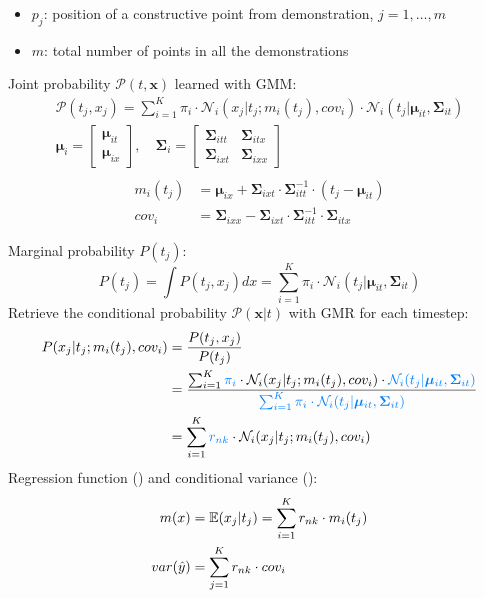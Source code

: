 \documentclass{article}
\begin{document}
\begin{itemize}
  \item $p_{j}$: position of a constructive point from demonstration, $j=1, \dots, m$
  \item $m$: total number of points in all the demonstrations
\end{itemize}
Joint probability $\mathcal{P}(t, \bm{x})$ learned with GMM:
\begin{gather}
  \mathcal{P}(t_{j}, x_{j}) = \sum^{K}_{i=1} \pi_{i} \cdot \mathcal{N}_{i}(x_{j}|t_{j};m_{i}(t_{j}),cov_{i}) \cdot \mathcal{N}_{i}(t_{j}|\bm{\mu}_{it}, \bm{\Sigma}_{it})\\
  \bm{\mu}_{i} =
  \begin{bmatrix}
    \bm{\mu}_{it} \\
    \bm{\mu}_{ix}
  \end{bmatrix}, \quad
  \bm{\Sigma}_{i} =
  \begin{bmatrix}
    \bm{\Sigma}_{itt} & \bm{\Sigma}_{itx}\\
    \bm{\Sigma}_{ixt} & \bm{\Sigma}_{ixx}
  \end{bmatrix}\\
\end{gather}
\begin{align}
  m_{i}(t_{j}) &= \bm{\mu}_{ix} + \bm{\Sigma}_{ixt} \cdot \bm{\Sigma}_{itt}^{-1} \cdot (t_{j} - \bm{\mu}_{it})\\
  cov_{i} &= \bm{\Sigma}_{ixx} - \bm{\Sigma}_{ixt} \cdot \bm{\Sigma}_{itt}^{-1} \cdot \bm{\Sigma}_{itx}
\end{align}

Marginal probability $P(t_{j})$:
\begin{equation}
  P(t_{j}) = \int P(t_{j}, x_{j})dx = \sum_{i=1}^{K} \pi_{i} \cdot \mathcal{N}_{i}(t_{j}|\bm{\mu}_{it}, \bm{\Sigma}_{it})
\end{equation}
Retrieve the conditional probability $\mathcal{P}(\bm{x}|t)$ with GMR for each timestep:
\begin{align}
  P(x_{j}|t_{j}; m_{i}(t_{j}), cov_{i}) &= \frac{P(t_{j}, x_{j})}{P(t_{j})}\\
  &= \frac{\sum^{K}_{i=1} \textcolor[rgb]{0,0.5,1}{\pi_{i}} \cdot \mathcal{N}_{i}(x_{j}|t_{j};m_{i}(t_{j}),cov_{i}) \cdot \textcolor[rgb]{0,0.5,1}{\mathcal{N}_{i}(t_{j}|\bm{\mu}_{it}, \bm{\Sigma}_{it})}}{\textcolor[rgb]{0,0.5,1}{\sum_{i=1}^{K} \pi_{i} \cdot \mathcal{N}_{i}(t_{j}|\bm{\mu}_{it}, \bm{\Sigma}_{it})}}\\
  &= \sum_{i=1}^{K} \textcolor[rgb]{0,0.5,1}{r_{nk}} \cdot \mathcal{N}_{i}(x_{j}|t_{j}; m_{i}(t_{j}), cov_{i})
\end{align}
Regression function () and conditional variance ():
\begin{align}
  m(x) &= \operatorname{\mathbb{E}}(x_{j}|t_{j}) = \sum_{i=1}^{K} r_{nk} \cdot m_{i}(t_{j})\label{eq:GMR:mean}\\
  var(\hat{y}) &= \sum_{j=1}^{K} r_{nk} \cdot cov_{i}\label{eq:GMR:var}
\end{align}
\end{document}
